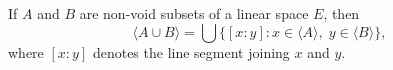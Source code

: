 If $A$ and $B$ are non-void subsets of a linear space $E$, then
$$
\langle A \cup B \rangle = \bigcup \{[x:y] : x \in \langle A \rangle,\; y \in \langle B \rangle\},
$$
where $[x:y]$ denotes the line segment joining $x$ and $y$.
